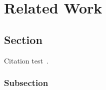 
\chapter{Related Work}\label{chapter:Related Work}

\section{Section}
Citation test~\parencite{latex}.

\subsection{Subsection}
